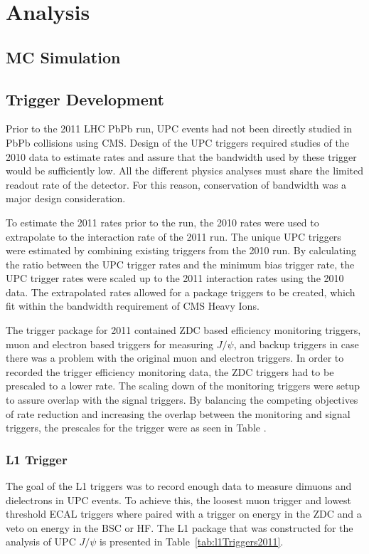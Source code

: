 \chapter{Analysis}	
  \section{MC Simulation}
  \section{\label{sec:TrigDev} Trigger Development} 
    Prior to the 2011 LHC PbPb run, UPC events had not been directly studied in 
      PbPb collisions using CMS. 
    Design of the UPC triggers required studies of the 2010 data to estimate 
      rates and assure that the bandwidth used by these trigger would be
      sufficiently low. 
    All the different physics analyses must share the limited readout rate of 
      the detector.
    For this reason, conservation of bandwidth was a major design consideration.

    To estimate the 2011 rates prior to the run, the 2010 rates were used to 
      extrapolate to the interaction rate of the 2011 run. 
    The unique UPC triggers were estimated by combining existing triggers from
      the 2010 run. 
    By calculating the ratio between the UPC trigger rates and the minimum bias
      trigger rate, the UPC trigger rates were scaled up to the 2011 
      interaction rates using the 2010 data. 
    The extrapolated rates allowed for a package triggers to be created, which 
      fit within the bandwidth requirement of CMS Heavy Ions. 
    
    The trigger package for 2011 contained ZDC based efficiency monitoring 
      triggers, muon and electron based triggers for measuring $J/\psi$, and 
      backup triggers in case there was a problem with the original muon and 
      electron triggers.
    In order to recorded the trigger efficiency monitoring data, the ZDC 
      triggers had to be prescaled to a lower rate. 
    The scaling down of the monitoring triggers were setup to assure overlap
      with the signal triggers.
    By balancing the competing objectives of rate reduction and increasing 
      the overlap between the monitoring and signal triggers, 
      the prescales for the trigger were as seen in Table .%

    \subsection{L1 Trigger}
      The goal of the L1 triggers was to record enough data to measure dimuons
        and dielectrons in UPC events.
      To achieve this, the loosest muon trigger and lowest threshold ECAL 
        triggers where paired with a trigger on energy in the ZDC and a veto on
	energy in the BSC or HF.
      The L1 package that was constructed for the analysis of UPC $J/\psi$ 
        is presented in Table~\ref{tab:l1Triggers2011}.

